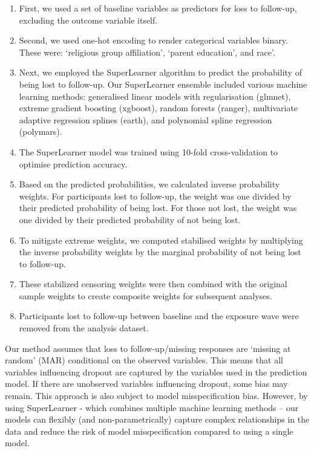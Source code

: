 \documentclass[
  single column]{article}
\begin{document}
\begin{enumerate}
\def\labelenumi{\arabic{enumi}.}
\item
  First, we used a set of baseline variables as predictors for loss to
  follow-up, excluding the outcome variable itself.
\item
  Second, we used one-hot encoding to render categorical variables
  binary. These were: `religious group affiliation', `parent education',
  and race'.
\item
  Next, we employed the SuperLearner algorithm to predict the
  probability of being lost to follow-up. Our SuperLearner ensemble
  included various machine learning methods: generalised linear models
  with regularisation (glmnet), extreme gradient boosting (xgboost),
  random forests (ranger), multivariate adaptive regression splines
  (earth), and polynomial spline regression (polymars).
\item
  The SuperLearner model was trained using 10-fold cross-validation to
  optimise prediction accuracy.
\item
  Based on the predicted probabilities, we calculated inverse
  probability weights. For participants lost to follow-up, the weight
  was one divided by their predicted probability of being lost. For
  those not lost, the weight was one divided by their predicted
  probability of not being lost.
\item
  To mitigate extreme weights, we computed stabilised weights by
  multiplying the inverse probability weights by the marginal
  probability of not being lost to follow-up.
\item
  These stabilized censoring weights were then combined with the
  original sample weights to create composite weights for subsequent
  analyses.
\item
  Participants lost to follow-up between baseline and the exposure wave
  were removed from the analysis dataset.
\end{enumerate}

Our method assumes that loss to follow-up/missing responses are `missing
at random' (MAR) conditional on the observed variables. This means that
all variables influencing dropout are captured by the variables used in
the prediction model. If there are unobserved variables influencing
dropout, some bias may remain. This approach is also subject to model
misspecification bias. However, by using SuperLearner - which combines
multiple machine learning methods -- our models can flexibly (and
non-parametrically) capture complex relationships in the data and reduce
the risk of model misspecification compared to using a single model.
\end{document}
